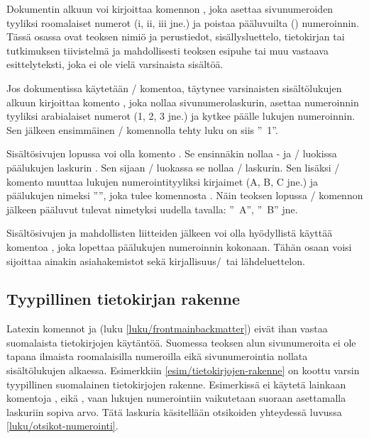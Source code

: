 Dokumentin alkuun voi kirjoittaa komennon , joka
asettaa sivunumeroiden tyyliksi roomalaiset numerot (i, ii, iii jne.) ja
poistaa pääluvuilta () numeroinnin. Tässä osassa ovat
teoksen nimiö ja perustiedot, sisällysluettelo, tietokirjan tai
tutkimuksen tiivistelmä ja mahdollisesti teoksen esipuhe tai muu
vastaava esittelyteksti, joka ei ole vielä varsinaista sisältöä.

Jos dokumentissa käytetään \-/ komentoa, täytynee
varsinaisten sisältölukujen alkuun kirjoittaa komento
, joka nollaa sivunumerolaskurin, asettaa
numeroinnin tyyliksi arabialaiset numerot (1, 2, 3 jne.) ja kytkee
päälle lukujen numeroinnin. Sen jälkeen ensimmäinen \-/
komennolla tehty luku on siis ''\chaptername~1''.

Sisältösivujen lopussa voi olla komento . Se
ensinnäkin nollaa - ja \-/ luokissa
päälukujen laskurin . Sen sijaan \-/
luokassa se nollaa \-/ laskurin. Sen lisäksi
\-/ komento muuttaa lukujen numerointityyliksi
kirjaimet (A, B, C jne.) ja päälukujen nimeksi ''\appendixname'', joka
tulee komennosta . Näin teoksen lopussa
\-/ komennon jälkeen pääluvut tulevat nimetyksi
uudella tavalla: ''\appendixname~A'', ''\appendixname~B'' jne.

Sisältösivujen ja mahdollisten liitteiden jälkeen voi olla hyödyllistä
käyttää komentoa , joka lopettaa päälukujen
numeroinnin kokonaan. Tähän osaan voisi sijoittaa ainakin asiahakemistot
sekä kirjallisuus\-/\ tai lähdeluettelon.

\subsection{Tyypillinen tietokirjan rakenne}
\label{luku/tyypillinen-tietokirja}

Latexin komennot  ja  (luku
\ref{luku/frontmainbackmatter}) eivät ihan vastaa suomalaista
tietokirjojen käytäntöä. Suomessa teoksen alun sivunumeroita ei ole
tapana ilmaista roomalaisilla numeroilla eikä sivunumerointia nollata
sisältölukujen alkaessa. Esimerkkiin \ref{esim/tietokirjojen-rakenne} on
koottu varsin tyypillinen suomalainen tietokirjojen rakenne. Esimerkissä
ei käytetä lainkaan komentoja ,
 eikä , vaan lukujen
numerointiin vaikutetaan suoraan asettamalla laskuriin
 sopiva arvo. Tätä laskuria käsitellään otsikoiden
yhteydessä luvussa \ref{luku/otsikot-numerointi}.

